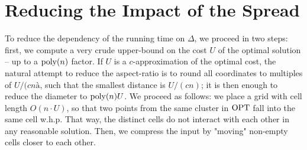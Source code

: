 %
%
%
%
%


\section{Reducing the Impact of the Spread}

To reduce the dependency of the running time on $\Delta$, we proceed in two steps: first, we compute a very crude upper-bound on the cost $U$ of the optimal
solution -- up to a $\operatorname{poly}(n)$ factor.  If $U$ is a $c$-approximation of the optimal cost, the natural attempt to reduce the aspect-ratio is to round all
coordinates to multiples of $U/(cnà$, such that the smallest distance is $U/(cn)$; it is then enough to reduce the diameter to $\operatorname{poly}(n) U$. We proceed as
follows: we place a grid with cell length $O(n \cdot U)$, so that two points from the same cluster in $\text{OPT}$ fall into the same cell w.h.p. That way, the
distinct cells do not interact with each other in any reasonable solution.  Then, we compress the input by "moving" non-empty cells closer to each other.

